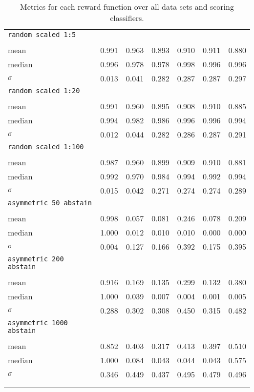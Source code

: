 \begin{center}
\begin{longtabu}{>{\scriptsize}l|>{\scriptsize}l|>{\scriptsize}l|>{\scriptsize}l|>{\scriptsize}l|>{\scriptsize}l|>{\scriptsize}l}
\hline
\texttt{random scaled 1:5} &&&&&& \\ &&&&&&\\
mean &0.991 &0.963 &0.893 &0.910 &0.911 &0.880 \\
median &0.996 &0.978 &0.978 &0.998 &0.996 &0.996 \\
$\sigma$ &0.013 &0.041 &0.282 &0.287 &0.287 &0.297 \\
\hline
\texttt{random scaled 1:20} &&&&&& \\ &&&&&&\\
mean &0.991 &0.960 &0.895 &0.908 &0.910 &0.885 \\
median &0.994 &0.982 &0.986 &0.996 &0.996 &0.994 \\
$\sigma$ &0.012 &0.044 &0.282 &0.286 &0.287 &0.291 \\
\hline
\texttt{random scaled 1:100} &&&&&& \\ &&&&&&\\
mean &0.987 &0.960 &0.899 &0.909 &0.910 &0.881 \\
median &0.992 &0.970 &0.984 &0.994 &0.992 &0.994 \\
$\sigma$ &0.015 &0.042 &0.271 &0.274 &0.274 &0.289 \\
\hline
\texttt{asymmetric 50 abstain} &&&&&& \\ &&&&&&\\
mean &0.998 &0.057 &0.081 &0.246 &0.078 &0.209 \\
median &1.000 &0.012 &0.010 &0.010 &0.000 &0.000 \\
$\sigma$ &0.004 &0.127 &0.166 &0.392 &0.175 &0.395 \\
\hline
\texttt{asymmetric 200 abstain} &&&&&& \\ &&&&&&\\
mean &0.916 &0.169 &0.135 &0.299 &0.132 &0.380 \\
median &1.000 &0.039 &0.007 &0.004 &0.001 &0.005 \\
$\sigma$ &0.288 &0.302 &0.308 &0.450 &0.315 &0.482 \\
\hline
\texttt{asymmetric 1000 abstain} &&&&&& \\ &&&&&&\\
mean &0.852 &0.403 &0.317 &0.413 &0.397 &0.510 \\
median &1.000 &0.084 &0.043 &0.044 &0.043 &0.575 \\
$\sigma$ &0.346 &0.449 &0.437 &0.495 &0.479 &0.496 \\
  &&&&&&\\

  \caption{Metrics for each reward function over all data
    sets and scoring classifiers.}
\end{longtabu}
\end{center}
